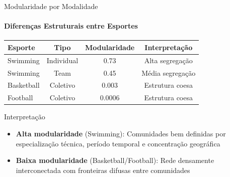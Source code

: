 \begin{frame}{Modularidade por Modalidade}
    \framesubtitle{Diferenças Estruturais entre Esportes}
    \begin{table}[h]
        \centering
        \begin{tabular}{lccc}
            \toprule
            \textbf{Esporte} & \textbf{Tipo} & \textbf{Modularidade} & \textbf{Interpretação} \\
            \midrule
            Swimming & Individual & 0.73 & Alta segregação \\
            Swimming & Team & 0.45 & Média segregação \\
            Basketball & Coletivo & 0.003 & Estrutura coesa \\
            Football & Coletivo & 0.0006 & Estrutura coesa \\
            \bottomrule
        \end{tabular}
    \end{table}

    \vspace{0.3cm}
    \begin{block}{Interpretação}
        \begin{itemize}
            \item \textbf{Alta modularidade} (Swimming): Comunidades bem definidas por especialização técnica, período temporal e concentração geográfica
            \item \textbf{Baixa modularidade} (Basketball/Football): Rede densamente interconectada com fronteiras difusas entre comunidades
        \end{itemize}
    \end{block}
\end{frame}

